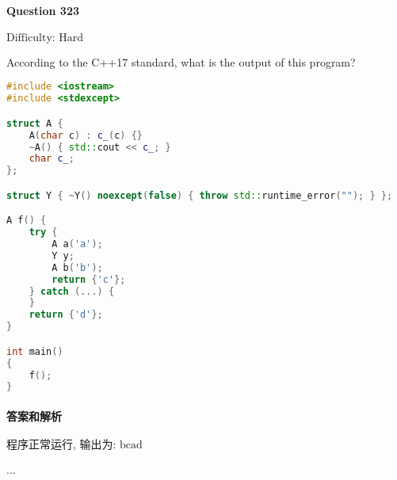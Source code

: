 \documentclass{article}
\begin{document}
	
	\paragraph*{Question 323} $\boxed{\text{Difficulty: Hard}} $			
	
	According to the C++17 standard, what is the output of this program?
	
	\begin{lstlisting}[language=C++]  		
#include <iostream>
#include <stdexcept>

struct A {
	A(char c) : c_(c) {}
	~A() { std::cout << c_; }
	char c_;
};

struct Y { ~Y() noexcept(false) { throw std::runtime_error(""); } };

A f() {
	try {
		A a('a');
		Y y;
		A b('b');
		return {'c'};
	} catch (...) {
	}
	return {'d'};
}

int main()
{
	f();
}
	\end{lstlisting}
	
	
	\paragraph*{答案和解析} $\boxed{\text{程序正常运行, 输出为: bcad}} $
	
	...
\end{document}
